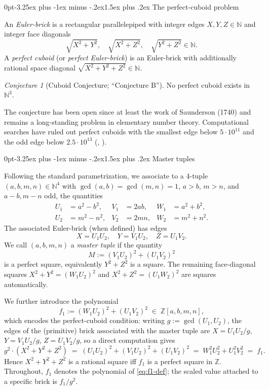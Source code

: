 \documentclass[12pt,a4paper,reqno]{amsart}
\makeatletter
\renewcommand{\subsection}{\@startsection{subsection}{2}%
  {0pt}{-3.25ex plus -1ex minus -.2ex}{1.5ex plus .2ex}%
  {\normalfont\normalsize\bfseries}}
\theoremstyle{plain}
\theoremstyle{definition}
\theoremstyle{remark}
\newtheorem{conjecture}[theorem]{Conjecture}
\newcommand{\Z}{\mathbb{Z}}
\newcommand{\N}{\mathbb{N}}
\makeatother
\begin{document}
\subsection{The perfect-cuboid problem}

An \emph{Euler-brick} is a rectangular parallelepiped with integer edges $X, Y, Z \in \N$ and integer face diagonals
$$
\sqrt{X^2 + Y^2}, \quad \sqrt{X^2 + Z^2}, \quad \sqrt{Y^2 + Z^2} \in \N.
$$
A \emph{perfect cuboid} (or \emph{perfect Euler-brick}) is an Euler-brick with additionally rational space diagonal $\sqrt{X^2 + Y^2 + Z^2} \in \N$.

\begin{conjecture}[Cuboid Conjecture; ``Conjecture B'']
\label{conj:B}
No perfect cuboid exists in $\N^3$.
\end{conjecture}

The conjecture has been open since at least the work of Saunderson (1740) and remains a long-standing problem in elementary number theory. Computational searches have ruled out perfect cuboids with the smallest edge below $5 \cdot 10^{11}$ and the odd edge below $2.5 \cdot 10^{13}$ (\cite{rathbun}, \cite{matson}).

\subsection{Master tuples}
\label{ssec:master-tuples}

Following the standard parametrization, we associate to a 4-tuple $(a, b, m, n) \in \N^4$ with $\gcd(a,b) = \gcd(m,n) = 1$, $a > b$, $m > n$, and $a-b, m-n$ odd, the quantities
\begin{align*}
U_1 &= a^2 - b^2, & V_1 &= 2ab, & W_1 &= a^2 + b^2, \\
U_2 &= m^2 - n^2, & V_2 &= 2mn, & W_2 &= m^2 + n^2.
\end{align*}
The associated Euler-brick (when defined) has edges
$$
X = U_1 U_2, \quad Y = V_1 U_2, \quad Z = U_1 V_2.
$$
We call $(a, b, m, n)$ a \emph{master tuple} if the quantity
$$
M := (V_1 U_2)^2 + (U_1 V_2)^2
$$
is a perfect square, equivalently $Y^2 + Z^2$ is a square. The remaining face-diagonal squares $X^2 + Y^2 = (W_1 U_2)^2$ and $X^2 + Z^2 = (U_1 W_2)^2$ are squares automatically.

We further introduce the polynomial
\begin{equation}\label{eq:f1-def}
f_1 := (W_1 U_2)^2 + (U_1 V_2)^2 \;\in\; \Z[a, b, m, n],
\end{equation}
which encodes the perfect-cuboid condition: writing $g := \gcd(U_1, U_2)$, the
edges of the (primitive) brick associated with the master tuple are
$X = U_1 U_2/g$, $Y = V_1 U_2/g$, $Z = U_1 V_2/g$, so a direct computation
gives
$$
g^2 \cdot (X^2 + Y^2 + Z^2) \;=\; (U_1 U_2)^2 + (V_1 U_2)^2 + (U_1 V_2)^2
\;=\; W_1^2 U_2^2 + U_1^2 V_2^2 \;=\; f_1.
$$
Hence $X^2 + Y^2 + Z^2$ is a rational square iff $f_1$ is a perfect square in
$\Z$. Throughout, $f_1$ denotes the polynomial of \eqref{eq:f1-def}; the
scaled value attached to a specific brick is $f_1/g^2$.
\end{document}
